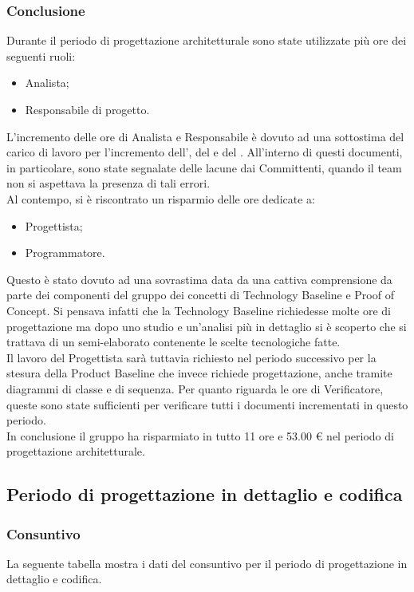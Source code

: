 \subsubsection{Conclusione}
Durante il periodo di progettazione architetturale sono state utilizzate più ore dei seguenti ruoli:
\begin{itemize}
	\item Analista;
	\item Responsabile di progetto.
\end{itemize} 
L'incremento delle ore di Analista e Responsabile è dovuto ad una sottostima del carico di lavoro per l'incremento dell'\AnalisiRequisiti{}, del \PianoProgetto{} e del \PianoQualifica{}. All'interno di questi documenti, in particolare, sono state segnalate delle lacune dai Committenti, quando il team non si aspettava la presenza di tali errori.\\
Al contempo, si è riscontrato un risparmio delle ore dedicate a:
\begin{itemize}
	\item Progettista;
	\item Programmatore.
\end{itemize}
Questo è stato dovuto ad una sovrastima data da una cattiva comprensione da parte dei componenti del gruppo dei concetti di Technology Baseline e Proof of Concept. Si pensava infatti che la Technology Baseline richiedesse molte ore di progettazione ma dopo uno studio e un'analisi più in dettaglio si è scoperto che si trattava di un semi-elaborato contenente le scelte tecnologiche fatte.\\
Il lavoro del Progettista sarà tuttavia richiesto nel periodo successivo per la stesura della Product Baseline che invece richiede progettazione, anche tramite diagrammi di classe e di sequenza. Per quanto riguarda le ore di Verificatore, queste sono state sufficienti per verificare tutti i documenti incrementati in questo periodo.\\
In conclusione il gruppo ha risparmiato in tutto 11 ore e 53.00 € nel periodo di progettazione architetturale.
\newpage
\subsection{Periodo di progettazione in dettaglio e codifica}
\subsubsection{Consuntivo} \label{consuntivo2}
La seguente tabella mostra i dati del consuntivo per il periodo di progettazione in dettaglio e codifica.

